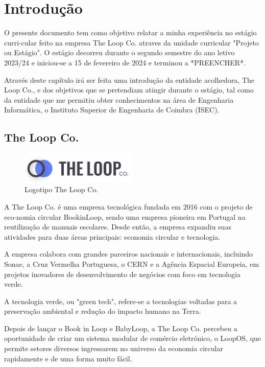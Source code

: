 \chapter{Introdução}


O presente documento tem como objetivo relatar a minha experiência no estágio curri-cular feito na empresa The Loop Co. atraves da unidade curricular "Projeto ou Estágio".
O estágio decorreu durante o segundo semestre do ano letivo 2023/24 e iniciou-se a 15 de fevereiro de 2024 e terminou a *PREENCHER*.

Através deste capítulo irá ser feita uma introdução da entidade acolhedora, The Loop Co., e dos objetivos que se pretendiam atingir durante o estágio, tal como da entidade que me permitiu obter conhecimentos na área de Engenharia Informática, o Instituto Superior de Engenharia de Coimbra (ISEC).

\section{The Loop Co.}
\begin{figure}[h]
    \centering
    \includegraphics[width=0.5\textwidth]{Imagens/logotipo.png} %
    \caption{Logotipo The Loop Co.}
    \label{fig:logotipo_the_loop_co}
\end{figure}

A The Loop Co. é uma empresa tecnológica fundada em 2016 com o projeto de eco-nomia circular BookinLoop, sendo uma empresa pioneira em Portugal na reutilização de manuais escolares. Desde então, a empresa expandiu suas atividades para duas áreas principais: economia circular e tecnologia.

A empresa colabora com grandes parceiros nacionais e internacionais, incluindo Sonae, a Cruz Vermelha Portuguesa, o CERN e a Agência Espacial Europeia, em projetos inovadores de desenvolvimento de negócios com foco em tecnologia verde.

A tecnologia verde, ou "green tech", refere-se a tecnologias voltadas para a preservação ambiental e redução do impacto humano na Terra.

Depois de lançar o Book in Loop e BabyLoop, a The Loop Co. percebeu a oportunidade de criar um sistema modular de comércio eletrónico, o LoopOS, que permite setores diversos ingressarem no universo da economia circular rapidamente e de uma forma muito fácil.

